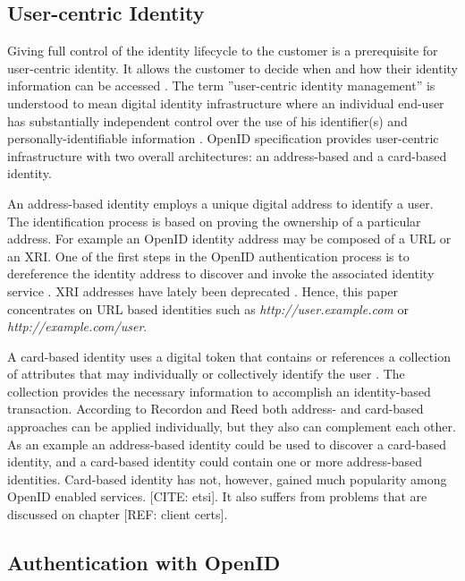 \documentclass{tktltiki}
\begin{document}
\subsection{User-centric Identity}

    Giving full control of the identity lifecycle to the customer is a prerequisite for user-centric identity. It allows the customer to decide when and how their identity information can be accessed \cite{open_identity_management_saas_2009}. The term ''user-centric identity management'' is understood to mean digital identity infrastructure where an individual end-user has substantially independent control over the use of his identifier(s) and personally-identifiable information \cite{openid_2.0_platform_2009}. OpenID specification provides user-centric infrastructure with two overall architectures: an address-based and a card-based identity.

    An address-based identity employs a unique digital address to identify a user. The identification process is based on proving the ownership of a particular address. For example an OpenID identity address may be composed of a URL or an XRI. One of the first steps in the OpenID authentication process is to dereference the identity address to discover and invoke the associated identity service \cite{openid_2.0_platform_2009}. XRI addresses have lately been deprecated \cite{xri_depcrecated_08a, xri_depcrecated_08b, xri_depcrecated_08c, xri_depcrecated_08d}. Hence, this paper concentrates on URL based identities such as \emph{http://user.example.com} or \emph{http://example.com/user}.

    A card-based identity uses a digital token that contains or references a collection of attributes that may individually or collectively identify the user \cite{openid_2.0_platform_2009}. The collection provides the necessary information to accomplish an identity-based transaction. According to Recordon and Reed \cite{openid_2.0_platform_2009} both address- and card-based approaches can be applied individually, but they also can complement each other. As an example an address-based identity could be used to discover a card-based identity, and a card-based identity could contain one or more address-based identities. Card-based identity has not, however, gained much popularity among OpenID enabled services. [CITE: etsi]. It also suffers from problems that are discussed on chapter [REF: client certs].

        
      
\subsection{Authentication with OpenID}
\end{document}
